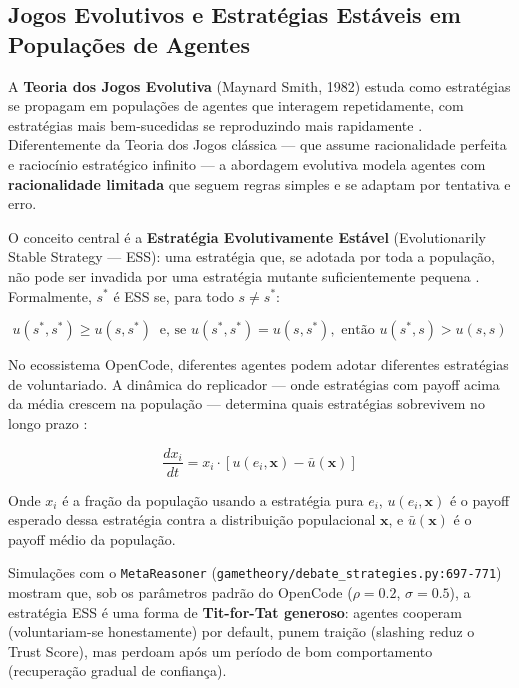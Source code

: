 \subsection{Jogos Evolutivos e Estratégias Estáveis em Populações de Agentes}

A \textbf{Teoria dos Jogos Evolutiva} (Maynard Smith, 1982) estuda como estratégias se propagam em populações de agentes que interagem repetidamente, com estratégias mais bem-sucedidas se reproduzindo mais rapidamente \cite{maynard1982evolution}. Diferentemente da Teoria dos Jogos clássica --- que assume racionalidade perfeita e raciocínio estratégico infinito --- a abordagem evolutiva modela agentes com \textbf{racionalidade limitada} que seguem regras simples e se adaptam por tentativa e erro.

O conceito central é a \textbf{Estratégia Evolutivamente Estável} (Evolutionarily Stable Strategy --- ESS): uma estratégia que, se adotada por toda a população, não pode ser invadida por uma estratégia mutante suficientemente pequena \cite{maynard1982evolution}. Formalmente, $s^*$ é ESS se, para todo $s \neq s^*$:

\begin{equation}\label{eq:ess}
u(s^*, s^*) \geq u(s, s^*) \ \text{ e, se } u(s^*, s^*) = u(s, s^*), \text{ então } u(s^*, s) > u(s, s)
\end{equation}

No ecossistema OpenCode, diferentes agentes podem adotar diferentes estratégias de voluntariado. A dinâmica do replicador --- onde estratégias com payoff acima da média crescem na população --- determina quais estratégias sobrevivem no longo prazo \cite{hofbauer1998evolutionary}:

\begin{equation}\label{eq:replicator}
\frac{dx_i}{dt} = x_i \cdot [u(e_i, \mathbf{x}) - \bar{u}(\mathbf{x})]
\end{equation}

Onde $x_i$ é a fração da população usando a estratégia pura $e_i$, $u(e_i, \mathbf{x})$ é o payoff esperado dessa estratégia contra a distribuição populacional $\mathbf{x}$, e $\bar{u}(\mathbf{x})$ é o payoff médio da população.

Simulações com o \texttt{MetaReasoner} (\texttt{gametheory/debate\_strategies.py:697-771}) mostram que, sob os parâmetros padrão do OpenCode ($\rho = 0.2$, $\sigma = 0.5$), a estratégia ESS é uma forma de \textbf{Tit-for-Tat generoso}: agentes cooperam (voluntariam-se honestamente) por default, punem traição (slashing reduz o Trust Score), mas perdoam após um período de bom comportamento (recuperação gradual de confiança).


